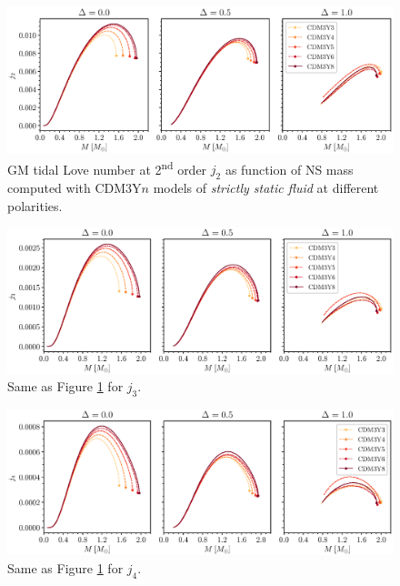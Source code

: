\begin{figure}[ht!]
        \centering
        \includegraphics[width=\textwidth]{fig/j2_stat.eps}
        \caption{\gls{GM} tidal Love number at 2\textsuperscript{nd} order $j_2$ as function of \gls{NS} mass computed with CDM3Y$n$ models of \emph{strictly static fluid} at different polarities.}
        \label{fig:j2_stat}
\end{figure} 
\begin{figure}[ht!]
        \centering
        \includegraphics[width=\textwidth]{fig/j3_stat.eps}
        \caption{Same as Figure \ref{fig:j2_stat} for $j_3$.}
        \label{fig:j3_stat}
\end{figure} 
\begin{figure}[ht!]
        \centering
        \includegraphics[width=\textwidth]{fig/j4_stat.eps}
        \caption{Same as Figure \ref{fig:j2_stat} for $j_4$.}
        \label{fig:j4_stat}
\end{figure} 
